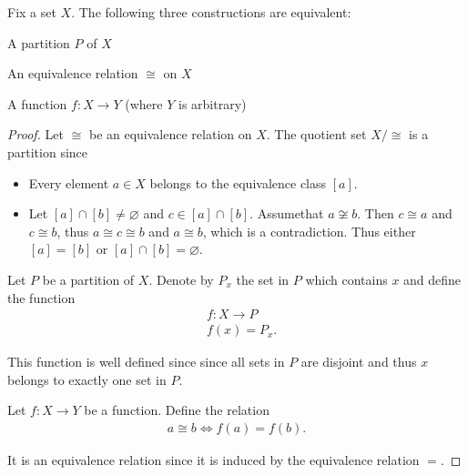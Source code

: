 \begin{proposition}\label{thm:equivalence_partition}
  Fix a set $X$. The following three constructions are equivalent:
  \begin{defenum}
    \item\label{thm:equivalence_partition/partition} A partition $P$ of $X$
    \item\label{thm:equivalence_partition/equivalence} An equivalence relation $\cong$ on $X$
    \item\label{thm:equivalence_partition/function} A function $f: X \to Y$ (where $Y$ is arbitrary)
  \end{defenum}
\end{proposition}
\begin{proof}
   Let $\cong$ be an equivalence relation on $X$. The quotient set $X / \cong$ is a partition since
  \begin{itemize}
    \item Every element $a \in X$ belongs to the equivalence class $[a]$.
    \item Let $[a] \cap [b] \neq \varnothing$ and $c \in [a] \cap [b]$. Assume\LEM that $a \not\cong b$. Then $c \cong a$ and $c \cong b$, thus $a \cong c \cong b$ and $a \cong b$, which is a contradiction. Thus either $[a] = [b]$ or $[a] \cap [b] = \varnothing$.
  \end{itemize}

   Let $P$ be a partition of $X$. Denote by $P_x$ the set in $P$ which contains $x$ and define the function
  \begin{align*}
    &f: X \to P \\
    &f(x) = P_x.
  \end{align*}

  This function is well defined since since all sets in $P$ are disjoint and thus $x$ belongs to exactly one set in $P$.

   Let $f: X \to Y$ be a function. Define the relation
  \begin{align*}
    a \cong b \iff f(a) = f(b).
  \end{align*}

  It is an equivalence relation since it is induced by the equivalence relation $=$.
\end{proof}

